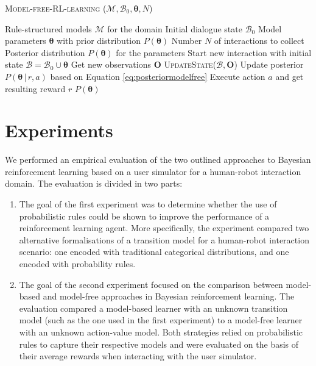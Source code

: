 \begin{algorithm}[h]
\caption{\textsc{Model-free-RL-learning} ($\mathcal{M}, \mathcal{B}_0, \boldsymbol\theta, N$)}
\begin{algorithmic}[1]\vspace{1mm}
\REQUIRE Rule-structured models $\mathcal{M}$ for the domain
\REQUIRE Initial dialogue state $\mathcal{B}_0$
\REQUIRE Model parameters $\boldsymbol\theta$ with prior distribution $P(\boldsymbol\theta)$
\REQUIRE Number $N$ of interactions to collect
\ENSURE Posterior distribution $P(\boldsymbol\theta)$ for the parameters  \vspace{1mm}
\STATE Start new interaction with initial state $\mathcal{B} = \mathcal{B}_0 \cup \boldsymbol\theta $
\STATE Get new observations $\mathbf{O}$
\STATE \textsc{UpdateState}($\mathcal{B}, \mathbf{O}$)
\STATE Update posterior $P(\boldsymbol\theta \, | \, r, a)$ based on Equation \eqref{eq:posteriormodelfree}
\STATE Execute action $a$ and get resulting reward $r$
\ENDIF
\ENDWHILE
\ENDFOR
\RETURN $P(\boldsymbol\theta)$
\end{algorithmic} 
\label{algo:rllearning_modelfree}
\end{algorithm}


\section{Experiments}
\label{sec:rllearning-experiments}

We performed an empirical evaluation of the two outlined approaches to Bayesian reinforcement learning based on a user simulator for a human-robot interaction domain. The evaluation is divided in two parts: 
\begin{enumerate}
\item The goal of the first experiment was to determine whether the use of probabilistic rules could be shown to improve the performance of a reinforcement learning agent.  More specifically, the experiment compared two alternative formalisations of a transition model for a human-robot interaction scenario: one encoded with traditional categorical distributions, and one encoded with probability rules.  

\item The goal of the second experiment focused on the comparison between model-based and model-free approaches in Bayesian reinforcement learning. The evaluation compared a model-based learner with an unknown transition model (such as the one used in the first experiment) to a model-free learner with an unknown action-value model.  Both strategies relied on probabilistic rules to capture their respective models and were evaluated on the basis of their average rewards when interacting with the user simulator. 
\end{enumerate}


